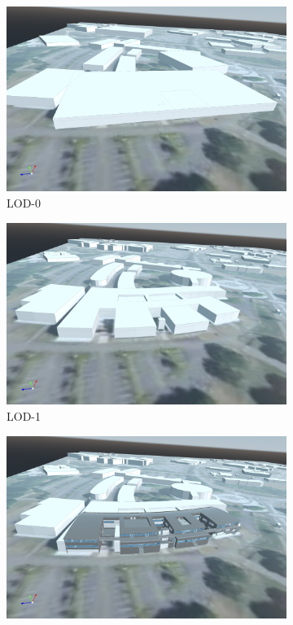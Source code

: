 \documentclass[runningheads]{llncs}
\begin{document}
\begin{figure}[htbp]
\centering
\begin{subfigure}{.4\textwidth}
  \centering
  \includegraphics[width=\linewidth]{images/buildings-lod0.png}
  \caption{LOD-0}
  \label{fig:sub1}
\end{subfigure}%
\begin{subfigure}{.4\textwidth}
  \centering
  \includegraphics[width=\linewidth]{images/buildings-lod1.png}
  \caption{LOD-1}
  \label{fig:sub2}
\end{subfigure}
\begin{subfigure}{.4\textwidth}
  \centering
  \includegraphics[width=\linewidth]{images/buildings-lod2.png}

\end{subfigure}
\end{figure}
\end{document}
